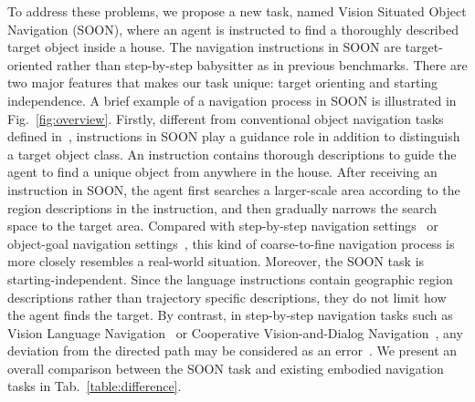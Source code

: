 \documentclass[final]{cvpr}
\begin{document}
To address these problems, we propose a new task, named Vision Situated Object Navigation (SOON), where an agent is instructed to find a thoroughly described target object inside a house. 
The navigation instructions in SOON are target-oriented rather than step-by-step babysitter as in previous benchmarks. 
There are two major features that makes our task unique: target orienting and starting independence. 
A brief example of a navigation process in SOON is illustrated in Fig.~\ref{fig:overview}. 
Firstly, different from conventional object navigation tasks defined in~\cite{wu2018building, savva2017minos}, instructions in SOON play a guidance role in addition to distinguish a target object class. 
An instruction contains thorough descriptions to guide the agent to find a unique object from anywhere in the house. 
After receiving an instruction in SOON, the agent first searches a larger-scale area according to the region descriptions in the instruction, and then gradually narrows the search space to the target area. 
Compared with step-by-step navigation settings~\cite{anderson2018vision} or object-goal navigation settings~\cite{wu2018building}, this kind of coarse-to-fine navigation process is more closely resembles a real-world situation. 
Moreover, the SOON task is starting-independent. Since the language instructions contain geographic region descriptions rather than trajectory specific descriptions, 
they do not limit how the agent finds the target. 
By contrast, in step-by-step navigation tasks such as Vision Language Navigation~\cite{anderson2018vision} or Cooperative Vision-and-Dialog Navigation~\cite{thomason2019vision}, any deviation from the directed path may be considered as an error~\cite{ilharco2019general}. 
We present an overall comparison between the SOON task and existing embodied navigation tasks in Tab.~\ref{table:difference}. 
\end{document}
